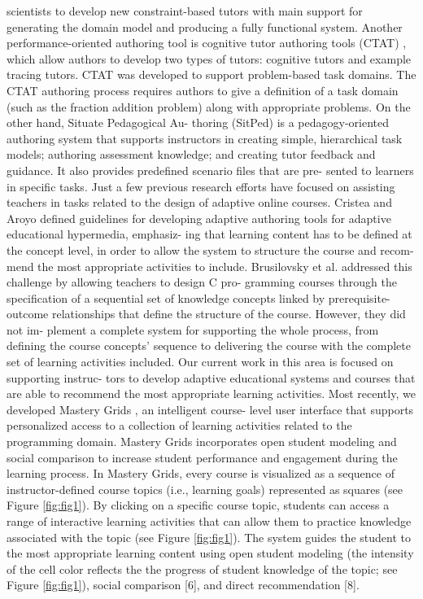 \documentclass{sig-alternate}
\begin{document}
scientists to develop new constraint-based tutors with main support
for generating the domain model and producing a fully functional
system. Another performance-oriented authoring tool is cognitive
tutor authoring tools (CTAT) \cite{first}, which allow authors to develop
two types of tutors: cognitive tutors and example tracing tutors.
CTAT was developed to support problem-based task domains. The CTAT authoring process requires authors to give a definition of
a task domain (such as the fraction addition problem) along with
appropriate problems. On the other hand, Situate Pedagogical Au-
thoring (SitPed) \cite{fourth} is a pedagogy-oriented authoring system that
supports instructors in creating simple, hierarchical task models;
authoring assessment knowledge; and creating tutor feedback and
guidance. It also provides predefined scenario files that are pre-
sented to learners in specific tasks.
Just a few previous research efforts have focused on assisting
teachers in tasks related to the design of adaptive online courses.
Cristea and Aroyo \cite{fifth} defined guidelines for developing adaptive
authoring tools for adaptive educational hypermedia, emphasiz-
ing that learning content has to be defined at the concept level,
in order to allow the system to structure the course and recom-
mend the most appropriate activities to include. Brusilovsky et al.
\cite{second} addressed this challenge by allowing teachers to design C pro-
gramming courses through the specification of a sequential set of
knowledge concepts linked by prerequisite-outcome relationships
that define the structure of the course. However, they did not im-
plement a complete system for supporting the whole process, from
defining the course concepts’ sequence to delivering the course
with the complete set of learning activities included.
Our current work in this area is focused on supporting instruc-
tors to develop adaptive educational systems and courses that are
able to recommend the most appropriate learning activities. Most
recently, we developed Mastery Grids \cite{sixth}, an intelligent course-
level user interface that supports personalized access to a collection
of learning activities related to the programming domain. Mastery
Grids incorporates open student modeling and social comparison to
increase student performance and engagement during the learning
process. In Mastery Grids, every course is visualized as a sequence
of instructor-defined course topics (i.e., learning goals) represented
as squares (see Figure \ref{fig:fig1}). By clicking on a specific course topic,
students can access a range of interactive learning activities that
can allow them to practice knowledge associated with the topic (see Figure
\ref{fig:fig1}). The system guides the student to the most appropriate
learning content using open student modeling (the intensity of the cell color reflects the the progress of student knowledge of the topic;
see Figure \ref{fig:fig1}), social comparison [6], and direct recommendation
[8].
\end{document}
